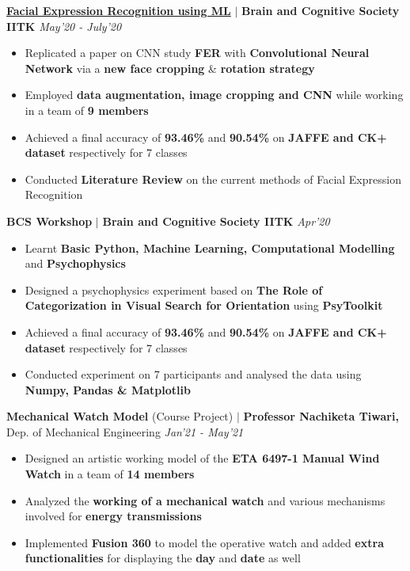 \documentclass[9pt]{extarticle}
\begin{document}
\hspace{-2mm}\textbf{\href{https://github.com/Lakshita2002/FER_brain_and_cognitive_society}{Facial Expression Recognition using ML}} $|$ \textbf{Brain and Cognitive Society IITK}
\hfill\hfill\textit{May'20 - July'20}\\
\vspace{-4mm}
\begin{itemize}
\item  Replicated a paper on CNN study \textbf{FER} with \textbf{Convolutional Neural Network} via a \textbf{new face cropping} \& \textbf{rotation strategy}
\item  Employed \textbf{data augmentation, image cropping and CNN} while working in a team of \textbf{9 members}
\item  Achieved a final accuracy of \textbf{93.46\%} and \textbf{90.54\%} on \textbf{JAFFE and CK+ dataset} respectively for 7 classes
\item Conducted \textbf{Literature Review} on the current methods of Facial Expression Recognition
\end{itemize}
\vspace{2.5mm}

\hspace{-2mm}\textbf{BCS Workshop} $|$ \textbf{Brain and Cognitive Society IITK}
\hfill\hfill\textit{Apr'20}\\
\vspace{-4mm}
\begin{itemize}
\item   Learnt \textbf{Basic Python, Machine Learning, Computational Modelling} and \textbf{Psychophysics}
\item Designed a psychophysics experiment based on \textbf{The Role of Categorization in Visual Search for Orientation} using \textbf{PsyToolkit}
\item  Achieved a final accuracy of \textbf{93.46\%} and \textbf{90.54\%} on \textbf{JAFFE and CK+ dataset} respectively for 7 classes
\item  Conducted experiment on 7 participants and analysed the data using \textbf{Numpy, Pandas \& Matplotlib}
\end{itemize}
\vspace{2.5mm}

\hspace{-2mm}\textbf{Mechanical Watch Model} (Course Project) $|$ \textbf{Professor Nachiketa Tiwari,} Dep. of Mechanical Engineering
\hfill\hfill\textit{Jan'21 - May'21}\\
\vspace{-4mm}
\begin{itemize}
\item  Designed an artistic working model of the \textbf{ETA 6497-1 Manual Wind Watch} in a team of \textbf{14 members}
\item Analyzed the \textbf{working of a mechanical watch} and various mechanisms involved for \textbf{energy transmissions}
\item Implemented \textbf{Fusion 360} to model the operative watch and added \textbf{extra functionalities} for displaying the \textbf{day} and \textbf{date} as well
\end{itemize}
\vspace{-1mm}
\end{document}
